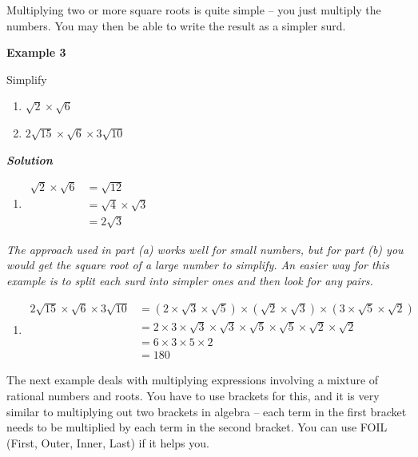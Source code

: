 \documentclass[
]{article}
\providecommand{\tightlist}{%
  \setlength{\itemsep}{0pt}\setlength{\parskip}{0pt}}
\begin{document}
Multiplying two or more square roots is quite simple -- you just
multiply the numbers. You may then be able to write the result as a
simpler surd.

\textbf{Example 3}

Simplify

\begin{enumerate}
\def\labelenumi{(\alph{enumi})}
\item
  \(\sqrt 2 \times \sqrt 6\)
\item
  \(2\sqrt {15} \times \sqrt 6 \times 3\sqrt {10}\)
\end{enumerate}

\textbf{\emph{Solution}}

\begin{enumerate}
\def\labelenumi{(\alph{enumi})}
\tightlist
\item
  \(\begin{array}{l} \sqrt 2 \times \sqrt 6 &= \sqrt {12} \\  &= \sqrt 4 \times \sqrt 3 \\  &= 2\sqrt 3 \end{array}\)
\end{enumerate}

\emph{The approach used in part (a) works well for small numbers, but
for part (b) you would get the square root of a large number to
simplify. An easier way for this example is to split each surd into
simpler ones and then look for any pairs.}

\begin{enumerate}
\def\labelenumi{(\alph{enumi})}
\setcounter{enumi}{1}
\tightlist
\item
  \(\begin{array}{l} 2\sqrt {15} \times \sqrt 6 \times 3\sqrt {10} &= (2 \times \sqrt 3 \times \sqrt 5 ) \times (\sqrt 2 \times \sqrt 3 ) \times (3 \times \sqrt 5 \times \sqrt 2 )\\  &= 2 \times 3 \times \sqrt 3 \times \sqrt 3 \times \sqrt 5 \times \sqrt 5 \times \sqrt 2 \times \sqrt 2 \\  &= 6 \times 3 \times 5 \times 2\\  &= 180 \end{array}\)
\end{enumerate}

The next example deals with multiplying expressions involving a mixture
of rational numbers and roots. You have to use brackets for this, and it
is very similar to multiplying out two brackets in algebra -- each term
in the first bracket needs to be multiplied by each term in the second
bracket. You can use FOIL (First, Outer, Inner, Last) if it helps you.
\end{document}
